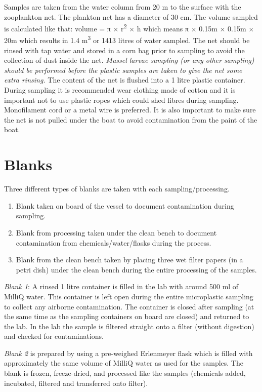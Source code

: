 \documentclass[
  icelandic,
]{book}
\providecommand{\tightlist}{%
  \setlength{\itemsep}{0pt}\setlength{\parskip}{0pt}}
\begin{document}
Samples are taken from the water column from 20 m to the surface with the zooplankton net. The plankton net has a diameter of 30 cm. The volume sampled is calculated like that: volume = π × r\textsuperscript{2} × h which means π × 0.15m × 0.15m × 20m which results in 1.4 m\textsuperscript{3} or 1413 litres of water sampled.
The net should be rinsed with tap water and stored in a corn bag prior to sampling to avoid the collection of dust inside the net.
\emph{Mussel larvae sampling (or any other sampling) should be performed before the plastic samples are taken to give the net some extra rinsing.}
The content of the net is flushed into a 1 litre plastic container.
During sampling it is recommended wear clothing made of cotton and it is important not to use plastic ropes which could shed fibres during sampling. Monofilament cord or a metal wire is preferred.
It is also important to make sure the net is not pulled under the boat to avoid contamination from the paint of the boat.

\hypertarget{blanks}{%
\chapter{Blanks}\label{blanks}}

Three different types of blanks are taken with each sampling/processing.

\begin{enumerate}
\def\labelenumi{\arabic{enumi}.}
\tightlist
\item
  Blank taken on board of the vessel to document contamination during sampling.
\item
  Blank from processing taken under the clean bench to document contamination from chemicals/water/flasks during the process.
\item
  Blank from the clean bench taken by placing three wet filter papers (in a petri dish) under the clean bench during the entire processing of the samples.
\end{enumerate}

\emph{Blank 1}: A rinsed 1 litre container is filled in the lab with around 500 ml of MilliQ water. This container is left open during the entire microplastic sampling to collect any airborne contamination. The container is closed after sampling (at the same time as the sampling containers on board are closed) and returned to the lab. In the lab the sample is filtered straight onto a filter (without digestion) and checked for contaminations.

\emph{Blank 2} is prepared by using a pre-weighed Erlenmeyer flask which is filled with approximately the same volume of MilliQ water as used for the samples. The blank is frozen, freeze-dried, and processed like the samples (chemicals added, incubated, filtered and transferred onto filter).
\end{document}
